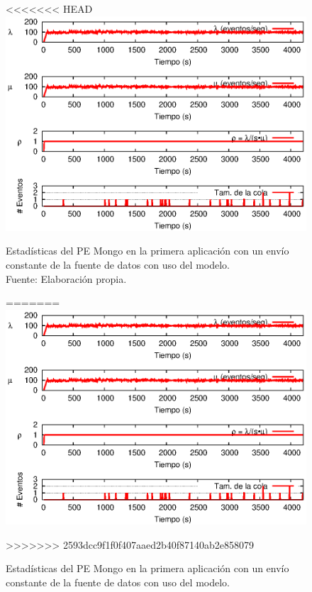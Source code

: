 \begin{figure}[!ht]
<<<<<<< HEAD
    \centering
    \captionsetup{justification=centering}
    \includegraphics[scale=1]{images/exp/app1/uniform/cm/statusMongoPE.eps}
    \caption[Estadísticas del PE Mongo en la primera aplicación con un envío constante de la fuente de datos con uso del modelo.]{Estadísticas del PE Mongo en la primera aplicación con un envío constante de la fuente de datos con uso del modelo.\\Fuente: Elaboración propia.}
=======
\centering
    \includegraphics[scale=1.1]{images/exp/app1/uniform/cm/statusMongoPE.eps}
    \caption{Estad\'isticas del PE Mongo en la primera aplicaci\'on con un env\'io constante de la fuente de datos con uso del modelo.}
>>>>>>> 2593dcc9f1f0f407aaed2b40f87140ab2e858079
    \label{fig:app1-uniform-statusMongoPE-cm}
\end{figure}


